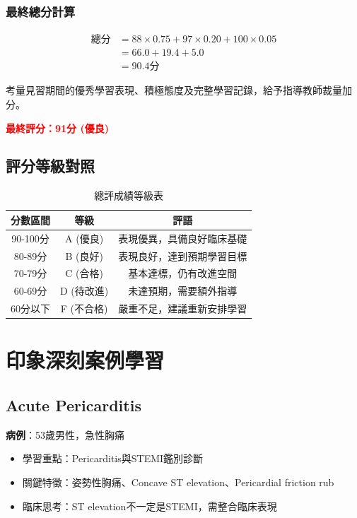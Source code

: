 \documentclass[12pt,a4paper]{article}
\begin{document}
\subsubsection{最終總分計算}
\begin{align}
\text{總分} &= 88 \times 0.75 + 97 \times 0.20 + 100 \times 0.05\\
&= 66.0 + 19.4 + 5.0\\
&= 90.4\text{分}
\end{align}

考量見習期間的優秀學習表現、積極態度及完整學習記錄，給予指導教師裁量加分。

\textcolor{red}{\Large \textbf{最終評分：91分 (優良)}}

\subsection{評分等級對照}
\begin{table}[h]
\centering
\caption{總評成績等級表}
\begin{tabular}{|c|c|c|}
\hline
\textbf{分數區間} & \textbf{等級} & \textbf{評語} \\
\hline
90-100分 & A (優良) & 表現優異，具備良好臨床基礎 \\
\hline
80-89分 & B (良好) & 表現良好，達到預期學習目標 \\
\hline
70-79分 & C (合格) & 基本達標，仍有改進空間 \\
\hline
60-69分 & D (待改進) & 未達預期，需要額外指導 \\
\hline
60分以下 & F (不合格) & 嚴重不足，建議重新安排學習 \\
\hline
\end{tabular}
\end{table}

\section{印象深刻案例學習}

\subsection{Acute Pericarditis}

\textbf{病例}：53歲男性，急性胸痛
\begin{itemize}
\item 學習重點：Pericarditis與STEMI鑑別診斷
\item 關鍵特徵：姿勢性胸痛、Concave ST elevation、Pericardial friction rub
\item 臨床思考：ST elevation不一定是STEMI，需整合臨床表現
\end{itemize}
\end{document}
